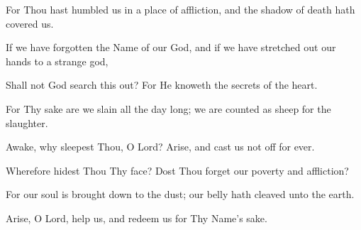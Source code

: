 For Thou hast humbled us in a place of affliction, and the shadow of death hath covered us.

If we have forgotten the Name of our God, and if we have stretched out our hands to a strange god,

Shall not God search this out? For He knoweth the secrets of the heart.

For Thy sake are we slain all the day long; we are counted as sheep for the slaughter.

Awake, why sleepest Thou, O Lord? Arise, and cast us not off for ever.

Wherefore hidest Thou Thy face? Dost Thou forget our poverty and affliction?

For our soul is brought down to the dust; our belly hath cleaved unto the earth.

Arise, O Lord, help us, and redeem us for Thy Name's sake.
